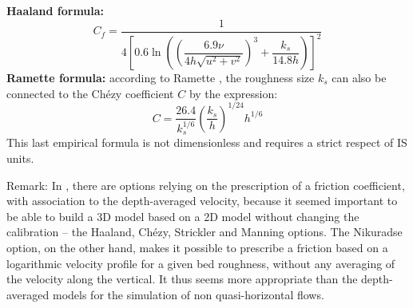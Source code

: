 \textbf{Haaland formula:}
\begin{equation}
  C_{f}=\dfrac{1}{4\left[0.6\ln\left(\left(\dfrac{6.9\nu}{4h\sqrt
            {u^{2}+v^{2}}}\right)^{3}+\dfrac{k_{s}}{14.8h}\right)\right]^{2}}
\end{equation}
\textbf{Ramette formula:}
according to Ramette \cite{ramette81}, the roughness size $k_{s}$ can also be
connected to the Ch\'{e}zy coefficient%
$C$ by the expression:
\begin{equation}
  C = \dfrac{26.4}{k_{s}^{1/6}}\left(\dfrac{k_{s}}{h}\right)^{1/24}h^{1/6}
\end{equation}
This last empirical formula is not dimensionless and requires a strict respect
of IS units.\\

\begin{CommentBlock}{Remark:}
In , there are options relying on the prescription of a friction coefficient,
with association to the depth-averaged velocity, because it seemed important to be able to
build a 3D model based on a 2D model without changing the calibration -- the Haaland, Chézy,
Strickler and Manning options. The Nikuradse
option, on the other hand, makes it possible to prescribe a friction based on a logarithmic
velocity profile for a given bed roughness, without any averaging of the velocity along the vertical.
It thus seems more appropriate than the depth-averaged models for the simulation of non quasi-horizontal flows.
\end{CommentBlock}
\newpage
